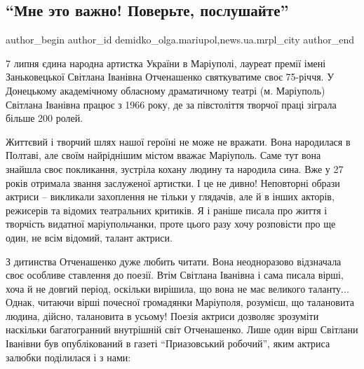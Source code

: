 
 
 
 
 
 
 
\subsection{\enquote{Мне это важно! Поверьте, послушайте}}
\label{sec:01_07_2020.stz.news.ua.mrpl_city.1.mne_eto_vazhno_poverjte_poslushajte}
 
\ifcmt
 author_begin
   author_id demidko_olga.mariupol,news.ua.mrpl_city
 author_end
\fi

7 липня єдина народна артистка України в Маріуполі, лауреат премії імені
Заньковецької Світлана Іванівна Отченашенко святкуватиме своє 75-річчя. У
Донецькому академічному обласному драматичному театрі (м. Маріуполь) Світлана
Іванівна працює з 1966 року, де за півстоліття творчої праці зіграла більше 200
ролей.


Життєвий і творчий шлях нашої героїні не може не вражати. Вона народилася в
Полтаві, але своїм найріднішим містом вважає Маріуполь. Саме тут вона знайшла
своє покликання, зустріла кохану людину та народила сина. Вже у 27 років
отримала звання заслуженої артистки. І це не дивно! Неповторні образи актриси
– викликали захоплення не тільки у глядачів, але й в інших акторів, режисерів
та відомих театральних критиків. Я і раніше писала про життя і творчість
видатної маріупольчанки, проте цього разу хочу розповісти про ще один, не всім
відомий, талант актриси.

З дитинства Отченашенко дуже любить читати. Вона неодноразово відзначала своє
особливе ставлення до поезії. Втім Світлана Іванівна і сама писала вірші, хоча
й не довгий період, оскільки вирішила, що вона не має великого таланту... Однак,
читаючи вірші  почесної громадянки Маріуполя, розумієш, що талановита людина,
дійсно, талановита в усьому! Поезія актриси дозволяє зрозуміти наскільки
багатогранний внутрішній світ Отченашенко. Лише один вірш Світлани Іванівни був
опублікований в газеті \enquote{Приазовський робочий}, яким актриса залюбки поділилася
і з нами:

